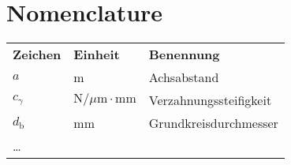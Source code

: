 \chapter{Nomenclature}
\begin{tabular}{llp{}}
\textbf{Zeichen} & \textbf{Einheit} & \textbf{Benennung}\\
$a$ & m & Achsabstand\\
$c_\gamma$ & $\text{N}/\mu\text{m}\cdot \text{mm}$ & Verzahnungssteifigkeit\\
$d_\mathrm{b}$ & mm & Grundkreisdurchmesser\\
\ldots
\end{tabular}
\vfill



